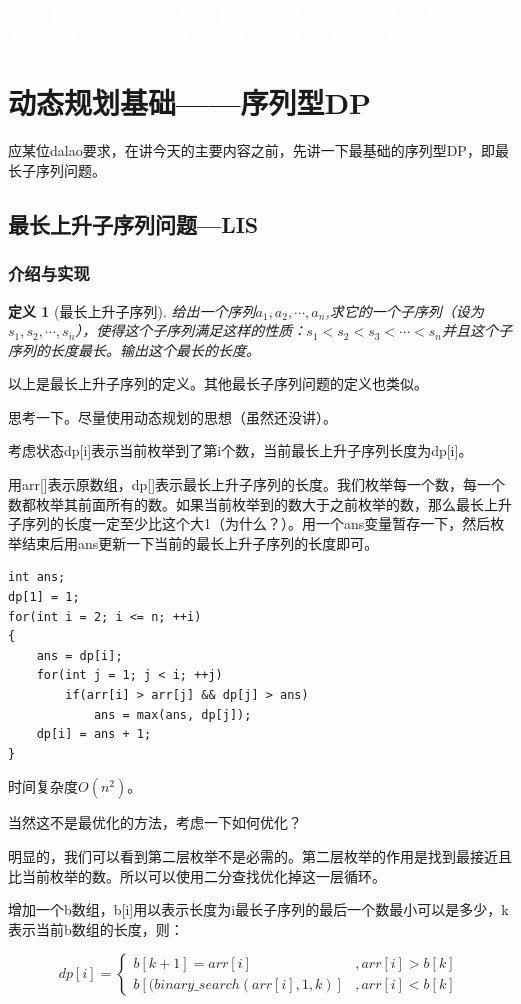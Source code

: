 \documentclass{article}
\newtheorem{definition}{定义}[subsection]
\theoremstyle{nonumberplain}
\begin{document}
\textcolor{white}{希望大家不要放弃，OIer这个群体很是特殊，并且饱受排挤，大家一定坚持下去，不管外界怎么看待我们，一定要记住自己的目标。不忘初心，方得始终。}
\newpage
\section{动态规划基础------序列型DP}
应某位dalao要求，在讲今天的主要内容之前，先讲一下最基础的序列型DP，即最长子序列问题。
\subsection{最长上升子序列问题---LIS}
\subsubsection{介绍与实现}
\begin{definition}[最长上升子序列]
	给出一个序列$a_1, a_2, \cdots, a_n$,求它的一个子序列（设为$s_1, s_2, \cdots, s_n$），使得这个子序列满足这样的性质：$s_1<s_2<s_3<\cdots<s_n$并且这个子序列的长度最长。输出这个最长的长度。
\end{definition}

以上是最长上升子序列的定义。其他最长子序列问题的定义也类似。

思考一下。尽量使用动态规划的思想（虽然还没讲）。

考虑状态dp[i]表示当前枚举到了第i个数，当前最长上升子序列长度为dp[i]。

用arr[]表示原数组，dp[]表示最长上升子序列的长度。我们枚举每一个数，每一个数都枚举其前面所有的数。如果当前枚举到的数大于之前枚举的数，那么最长上升子序列的长度一定至少比这个大1（为什么？）。用一个ans变量暂存一下，然后枚举结束后用ans更新一下当前的最长上升子序列的长度即可。
\begin{verbatim}
int ans;  
dp[1] = 1;  
for(int i = 2; i <= n; ++i)  
{
    ans = dp[i];  
    for(int j = 1; j < i; ++j)
        if(arr[i] > arr[j] && dp[j] > ans)  
            ans = max(ans, dp[j]);  
    dp[i] = ans + 1;
}
\end{verbatim}

时间复杂度$O(n^2)$。

当然这不是最优化的方法，考虑一下如何优化？

明显的，我们可以看到第二层枚举不是必需的。第二层枚举的作用是找到最接近且比当前枚举的数。所以可以使用二分查找优化掉这一层循环。

增加一个b数组，b[i]用以表示长度为i最长子序列的最后一个数最小可以是多少，k表示当前b数组的长度，则：

\begin{equation*}
	dp[i]=\begin{cases}
		b[k+1]=arr[i]                  & , arr[i]>b[k] \\
		b[(binary\_search(arr[i],1,k)] & , arr[i]<b[k]
	\end{cases}
\end{equation*}
\end{document}
